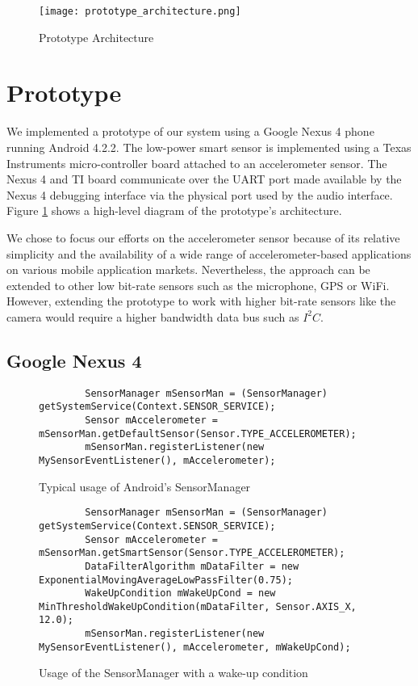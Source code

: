 
\begin{figure}[t]
	\texttt{[image: prototype\_architecture.png]}
	\caption{Prototype Architecture}
    \label{fig:prototypeArchitecture}
\end{figure}

\section{Prototype}
\label{sec:prototype}

We implemented a prototype of our system using a Google Nexus 4 phone
running Android 4.2.2. The low-power smart sensor is implemented using
a Texas Instruments micro-controller board attached to an
accelerometer sensor. The Nexus 4 and TI board communicate over the
UART port made available by the Nexus 4 debugging interface via the
physical port used by the audio interface. Figure
\ref{fig:prototypeArchitecture} shows a high-level diagram of the
prototype's architecture.

We chose to focus our efforts on the accelerometer sensor because of
its relative simplicity and the availability of a wide range of
accelerometer-based applications on various mobile application
markets. Nevertheless, the approach can be extended to other low
bit-rate sensors such as the microphone, GPS or WiFi. However,
extending the prototype to work with higher bit-rate sensors like the
camera would require a higher bandwidth data bus such as $I^2C$.


\subsection{Google Nexus 4}
\label{subsec:nexus}

\begin{figure*}[t]
{\small
	\begin{verbatim}
		SensorManager mSensorMan = (SensorManager) getSystemService(Context.SENSOR_SERVICE);
		Sensor mAccelerometer = mSensorMan.getDefaultSensor(Sensor.TYPE_ACCELEROMETER);
		mSensorMan.registerListener(new MySensorEventListener(), mAccelerometer);
	\end{verbatim}
}
	\caption{Typical usage of Android's SensorManager}
    \label{fig:androidSensorCodeNormal}
\end{figure*}

\begin{figure*}[t]
{\small
	\begin{verbatim}
		SensorManager mSensorMan = (SensorManager) getSystemService(Context.SENSOR_SERVICE);
		Sensor mAccelerometer = mSensorMan.getSmartSensor(Sensor.TYPE_ACCELEROMETER);
		DataFilterAlgorithm mDataFilter = new ExponentialMovingAverageLowPassFilter(0.75);
		WakeUpCondition mWakeUpCond = new MinThresholdWakeUpCondition(mDataFilter, Sensor.AXIS_X, 12.0);
		mSensorMan.registerListener(new MySensorEventListener(), mAccelerometer, mWakeUpCond);
	\end{verbatim}
}
	\caption{Usage of the SensorManager with a wake-up condition}
    \label{fig:androidSensorCodeModified}
\end{figure*}

